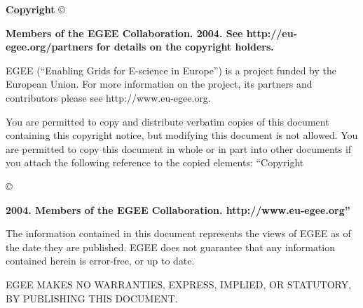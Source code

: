 %
%
%
%
\vfill{\bf Copyright }\copyright{\bf Members of the EGEE Collaboration. 2004. 
See http://eu-egee.org/partners for details on the copyright holders. 

EGEE (``Enabling Grids for E-science in Europe'') is a project funded by
the European Union.  For more information on the project, its partners
and contributors please see http://www.eu-egee.org.

You are permitted to copy and distribute verbatim copies of this
document containing this copyright notice, but modifying this document
is not allowed. You are permitted to copy this document in whole or in
part into other documents if you attach the following reference to the
copied elements: ``Copyright }\copyright{\bf 2004. Members of the EGEE
Collaboration. http://www.eu-egee.org''

The information contained in this document represents the views of
EGEE as of the date they are published. EGEE does not guarantee that
any information contained herein is error-free, or up to date.

EGEE MAKES NO WARRANTIES, EXPRESS, IMPLIED, OR STATUTORY, BY
PUBLISHING THIS DOCUMENT.}

